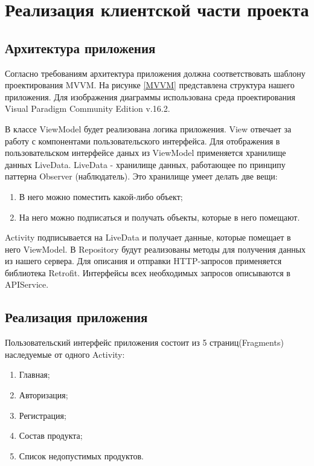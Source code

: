 \section{Реализация клиентской части проекта}

\subsection{Архитектура приложения}

Согласно требованиям архитектура приложения должна соответствовать шаблону проектирования MVVM\cite{8}. На рисунке \ref{MVVM} представлена структура нашего приложения. Для изображения диаграммы использована среда проектирования Visual Paradigm Community Edition v.16.2.


В классе ViewModel будет реализована логика приложения. View отвечает за работу с компонентами пользовательского интерфейса. Для отображения в пользовательском интерфейсе даных из ViewModel применяется хранилище данных LiveData\cite{9}.
LiveData - хранилище данных, работающее по принципу паттерна Observer (наблюдатель). Это хранилище умеет делать две вещи:
\begin{enumerate}
	\item В него можно поместить какой-либо объект;
	\item На него можно подписаться и получать объекты, которые в него помещают.
\end{enumerate}

Activity подписывается на LiveData и получает данные, которые помещает в него ViewModel. В Repository будут реализованы методы для получения данных из нашего сервера. Для описания и отправки HTTP-запросов применяется библиотека Retrofit\cite{10}. Интерфейсы всех необходимых запросов описываются в APIService.


\subsection{Реализация приложения}

Пользовательский интерфейс приложения состоит из 5 страниц(Fragments) наследуемые от одного Activity:
\begin{enumerate}
	\item Главная;
	\item Авторизация;
	\item Регистрация;
	\item Состав продукта;
	\item Список недопустимых продуктов.
\end{enumerate}


